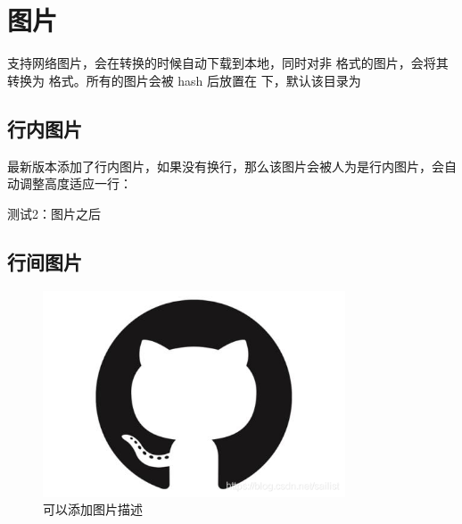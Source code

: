 \documentclass{article}%
\begin{document}
%
\section{图片}%

%
支持网络图片，会在转换的时候自动下载到本地，同时对非  格式的图片，会将其转换为  格式。所有的图片会被 hash 后放置在  下，默认该目录为 %

%
\subsection{行内图片}%

%

%
最新版本添加了行内图片，如果没有换行，那么该图片会被人为是行内图片，会自动调整高度适应一行：%

%
测试2：图片之后%

%
\subsection{行间图片}%

%

%
\begin{center}%


\begin{figure}[H]%
%
\includegraphics[width=0.8\textwidth]{imgs/1c59f8ef2aa3c5e527a22b7c258489d6.png}%
\caption{可以添加图片描述}%
\end{figure}

%
\end{center}%
\end{document}
